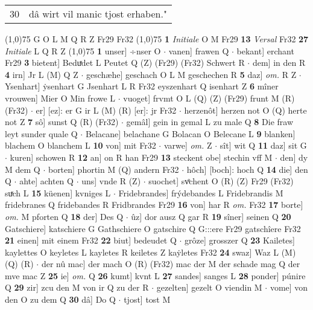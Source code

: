 \documentclass[8pt,a4paper,notitlepage]{article}
\begin{document}
\begin{table}[ht]
\begin{minipage}[t]{0.5\linewidth}
\begin{tabular}{rl}
30 & dâ wirt vil manic tjost erhaben."\\ 
\end{tabular}
\scriptsize
\line(1,0){75} \newline
G O L M Q R Z Fr29 Fr32 \newline
\line(1,0){75} \newline
\textbf{1} \textit{Initiale} O M Fr29  \textbf{13} \textit{Versal} Fr32  \textbf{27} \textit{Initiale} L Q R Z  \newline
\line(1,0){75} \newline
\textbf{1} unser] ÷nser O  $\cdot$ vanen] frawen Q  $\cdot$ bekant] erchant Fr29 \textbf{3} bietent] Beduͯdet L Peutet Q (Z) (Fr29) (Fr32) Schwert R  $\cdot$ dem] in den R \textbf{4} irn] Jr L (M) Q Z  $\cdot$ geschæhe] geschach O L M geschechen R \textbf{5} daz] \textit{om.} R Z  $\cdot$ Ysenhart] ẏsenhart G Jsenhart L R Fr32 eyszenhart Q isenhart Z \textbf{6} mîner vrouwen] Mier O Min frowe L  $\cdot$ vuoget] frvmt O L (Q) (Z) (Fr29) frunt M (R) (Fr32)  $\cdot$ er] [ez]: er G ir L (M) (R) [er]: jr  Fr32  $\cdot$ herzenôt] herzen not O (Q) herte not Z \textbf{7} sô] sunst Q (R) (Fr32)  $\cdot$ gemâl] gein in gemal L zu male Q \textbf{8} Die fraw leyt sunder quale Q  $\cdot$ Belacane] belachane G Bolacan O Belecane L \textbf{9} blanken] blachem O blanchem L \textbf{10} von] mit Fr32  $\cdot$ varwe] \textit{om.} Z  $\cdot$ sît] wit Q \textbf{11} daz] sit G  $\cdot$ kuren] schowen R \textbf{12} an] on R han Fr29 \textbf{13} steckent obe] stechin vff M  $\cdot$ den] dy M dem Q  $\cdot$ borten] phortin M (Q) andern Fr32  $\cdot$ hôch] [boch]: hoch Q \textbf{14} die] den Q  $\cdot$ ahte] achten Q  $\cdot$ uns] vnde R (Z)  $\cdot$ suochet] svͦchent O (R) (Z) Fr29 (Fr32) suͯch L \textbf{15} küenen] kvniges L  $\cdot$ Fridebrandes] frýdebandes L Fridebrandis M fridebranes Q fridebandes R Fridbrandes Fr29 \textbf{16} von] har R \textit{om.} Fr32 \textbf{17} borte] \textit{om.} M pforten Q \textbf{18} der] Des Q  $\cdot$ ûz] dor ausz Q gar R \textbf{19} sîner] seinen Q \textbf{20} Gatschiere] katschiere G Gathschiere O gatschire Q G:::ere Fr29 gatschîere Fr32 \textbf{21} einen] mit einem Fr32 \textbf{22} biut] bedeudet Q  $\cdot$ grôze] grosszer Q \textbf{23} Kailetes] kaylettes O keyletes L kayletes R keiletes Z kaẏletes Fr32 \textbf{24} swaz] Waz L (M) (Q) (R)  $\cdot$ der nû mac] der mach O (R) (Fr32) mac der M der schade mag Q der mve mac Z \textbf{25} ie] \textit{om.} Q \textbf{26} kumt] kvnt L \textbf{27} sandes] sanges L \textbf{28} ponder] púnire Q \textbf{29} zir] zcu den M von ir Q zu der R  $\cdot$ gezelten] gezelt O viendin M  $\cdot$ vome] von den O zu dem Q \textbf{30} dâ] Do Q  $\cdot$ tjost] tost M \newline

\end{minipage}
\end{table}
\end{document}

